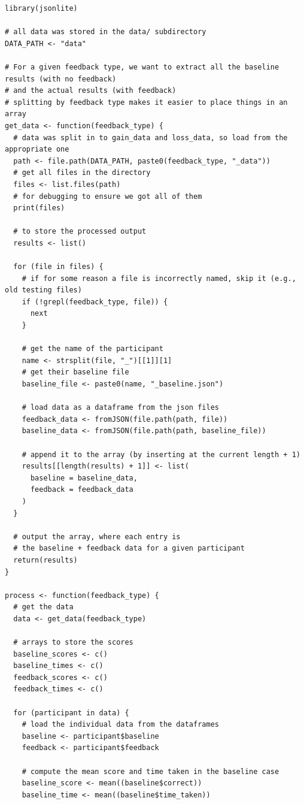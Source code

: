 \documentclass[12pt]{exam}
\begin{document}
\begin{verbatim}
library(jsonlite)

# all data was stored in the data/ subdirectory
DATA_PATH <- "data"

# For a given feedback type, we want to extract all the baseline results (with no feedback)
# and the actual results (with feedback)
# splitting by feedback type makes it easier to place things in an array
get_data <- function(feedback_type) {
  # data was split in to gain_data and loss_data, so load from the appropriate one
  path <- file.path(DATA_PATH, paste0(feedback_type, "_data"))
  # get all files in the directory
  files <- list.files(path)
  # for debugging to ensure we got all of them
  print(files)
  
  # to store the processed output
  results <- list()
  
  for (file in files) {
    # if for some reason a file is incorrectly named, skip it (e.g., old testing files)
    if (!grepl(feedback_type, file)) {
      next
    }
    
    # get the name of the participant
    name <- strsplit(file, "_")[[1]][1]
    # get their baseline file
    baseline_file <- paste0(name, "_baseline.json")
    
    # load data as a dataframe from the json files
    feedback_data <- fromJSON(file.path(path, file))
    baseline_data <- fromJSON(file.path(path, baseline_file))
    
    # append it to the array (by inserting at the current length + 1)
    results[[length(results) + 1]] <- list(
      baseline = baseline_data,
      feedback = feedback_data
    )
  }
  
  # output the array, where each entry is
  # the baseline + feedback data for a given participant
  return(results)
}

process <- function(feedback_type) {
  # get the data
  data <- get_data(feedback_type)
  
  # arrays to store the scores
  baseline_scores <- c()
  baseline_times <- c()
  feedback_scores <- c()
  feedback_times <- c()
  
  for (participant in data) {
    # load the individual data from the dataframes
    baseline <- participant$baseline
    feedback <- participant$feedback
    
    # compute the mean score and time taken in the baseline case
    baseline_score <- mean((baseline$correct))
    baseline_time <- mean((baseline$time_taken))
    

\end{verbatim}
\end{document}
